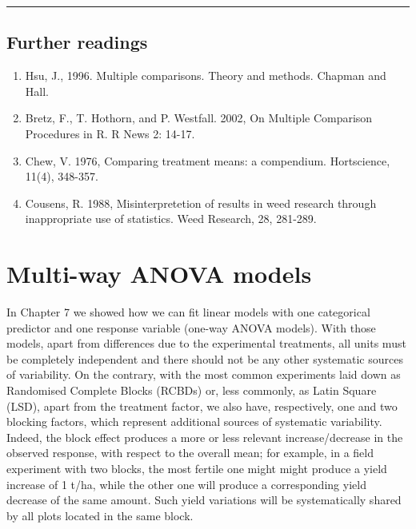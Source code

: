 \documentclass[a4paper,12pt,oneside]{book}
\providecommand{\tightlist}{%
  \setlength{\itemsep}{0pt}\setlength{\parskip}{0pt}}
\begin{document}
\begin{center}\rule{0.5\linewidth}{0.5pt}\end{center}

\hypertarget{further-readings-7}{%
\section{Further readings}\label{further-readings-7}}

\begin{enumerate}
\def\labelenumi{\arabic{enumi}.}
\tightlist
\item
  Hsu, J., 1996. Multiple comparisons. Theory and methods. Chapman and Hall.
\item
  Bretz, F., T. Hothorn, and P. Westfall. 2002, On Multiple Comparison Procedures in R. R News 2: 14-17.
\item
  Chew, V. 1976, Comparing treatment means: a compendium. Hortscience, 11(4), 348-357.
\item
  Cousens, R. 1988, Misinterpretetion of results in weed research through inappropriate use of statistics. Weed Research, 28, 281-289.
\end{enumerate}

\hypertarget{multi-way-anova-models}{%
\chapter{Multi-way ANOVA models}\label{multi-way-anova-models}}

In Chapter 7 we showed how we can fit linear models with one categorical predictor and one response variable (one-way ANOVA models). With those models, apart from differences due to the experimental treatments, all units must be completely independent and there should not be any other systematic sources of variability. On the contrary, with the most common experiments laid down as Randomised Complete Blocks (RCBDs) or, less commonly, as Latin Square (LSD), apart from the treatment factor, we also have, respectively, one and two blocking factors, which represent additional sources of systematic variability. Indeed, the block effect produces a more or less relevant increase/decrease in the observed response, with respect to the overall mean; for example, in a field experiment with two blocks, the most fertile one might might produce a yield increase of 1 t/ha, while the other one will produce a corresponding yield decrease of the same amount. Such yield variations will be systematically shared by all plots located in the same block.
\end{document}
